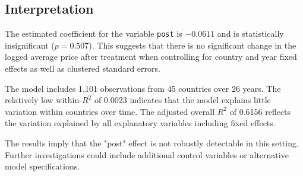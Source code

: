 \documentclass{article}
\begin{document}
\bigskip

\subsection*{Interpretation}

The estimated coefficient for the variable \texttt{post} is \(-0.0611\) and is statistically insignificant (\(p = 0.507\)). This suggests that there is no significant change in the logged average price after treatment when controlling for country and year fixed effects as well as clustered standard errors.

The model includes 1,101 observations from 45 countries over 26 years. The relatively low within-$R^2$ of 0.0023 indicates that the model explains little variation within countries over time. The adjusted overall $R^2$ of 0.6156 reflects the variation explained by all explanatory variables including fixed effects.

The results imply that the "post" effect is not robustly detectable in this setting. Further investigations could include additional control variables or alternative model specifications.
\end{document}

